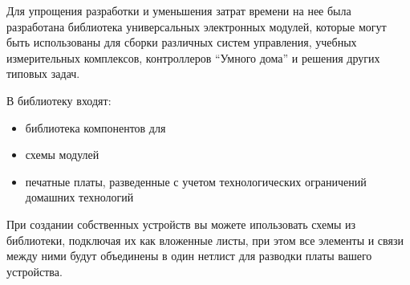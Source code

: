 \secdown

Для упрощения разработки и уменьшения затрат времени на нее была разработана
библиотека универсальных электронных модулей, которые могут быть использованы
для сборки различных систем управления, учебных измерительных комплексов,
контроллеров ``Умного дома'' и решения других типовых задач.

В библиотеку входят:

\begin{itemize}
  \item библиотека компонентов для \kicad
  \item схемы модулей
  \item печатные платы, разведенные с учетом технологических ограничений
  домашних технологий
\end{itemize}

При создании собственных устройств вы можете ипользовать схемы из библиотеки,
подключая их как вложенные листы, при этом все элементы и связи между ними будут
объединены в один нетлист для разводки платы вашего устройства.



\secup
